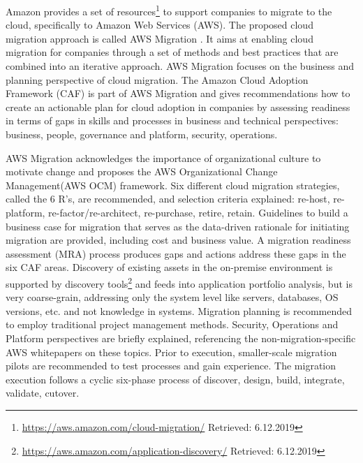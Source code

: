 Amazon provides a set of resources\footnote{\url{https://aws.amazon.com/cloud-migration/} Retrieved: 6.12.2019} to support companies to migrate to the cloud, specifically to Amazon Web Services (AWS).
The proposed cloud migration approach is called AWS Migration \autocite{AmazonWebServices2018Migration,AmazonWebServices2017CAF}.
It aims at enabling cloud migration for companies through a set of methods and best practices that are combined into an iterative approach.
AWS Migration focuses on the business and planning perspective of cloud migration.
The Amazon Cloud Adoption Framework (CAF) \autocite{AmazonWebServices2017CAF} is part of AWS Migration and gives recommendations how to create an actionable plan for cloud adoption in companies by assessing readiness in terms of gaps in skills and processes in business and technical perspectives: business, people, governance and platform, security, operations.

AWS Migration acknowledges the importance of organizational culture to motivate change and proposes the AWS Organizational Change Management(AWS OCM) framework.
Six different cloud migration strategies, called the 6 R's, are recommended, and selection criteria explained: re-host, re-platform, re-factor/re-architect, re-purchase, retire, retain.
Guidelines to build a \gls{business case} for migration that serves as the data-driven rationale for initiating migration are provided, including cost and business value.
A migration readiness assessment (MRA) process produces gaps and actions address these gaps in the six CAF areas.
Discovery of existing assets in the on-premise environment is supported by discovery tools\footnote{\url{https://aws.amazon.com/application-discovery/} Retrieved: 6.12.2019} and feeds into application portfolio analysis, but is very coarse-grain, addressing only the system level like servers, databases, OS versions, etc. and not knowledge in systems.
Migration planning is recommended to employ traditional project management methods.
Security, Operations and Platform perspectives are briefly explained, referencing the non-migration-specific AWS whitepapers on these topics.
Prior to execution, smaller-scale migration pilots are recommended to test processes and gain experience.
The migration execution follows a cyclic six-phase process of discover, design, build, integrate, validate, cutover.

